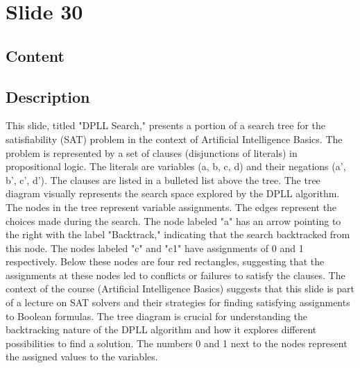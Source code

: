 \documentclass{article}%
\begin{document}
%
\newpage%
\section{Slide 30}%
\label{sec:Slide30}%
\subsection{Content}%
%
\subsection{Description}%
This slide, titled "DPLL Search," presents a portion of a search tree for the satisfiability (SAT) problem in the context of Artificial Intelligence Basics. The problem is represented by a set of clauses (disjunctions of literals) in propositional logic. The literals are variables (a, b, c, d) and their negations (a', b', c', d'). The clauses are listed in a bulleted list above the tree. The tree diagram visually represents the search space explored by the DPLL algorithm. The nodes in the tree represent variable assignments. The edges represent the choices made during the search.  The node labeled "a" has an arrow pointing to the right with the label "Backtrack," indicating that the search backtracked from this node.  The nodes labeled "c" and "c1" have assignments of 0 and 1 respectively.  Below these nodes are four red rectangles, suggesting that the assignments at these nodes led to conflicts or failures to satisfy the clauses. The context of the course (Artificial Intelligence Basics) suggests that this slide is part of a lecture on SAT solvers and their strategies for finding satisfying assignments to Boolean formulas. The tree diagram is crucial for understanding the backtracking nature of the DPLL algorithm and how it explores different possibilities to find a solution. The numbers 0 and 1 next to the nodes represent the assigned values to the variables.%
\end{document}
